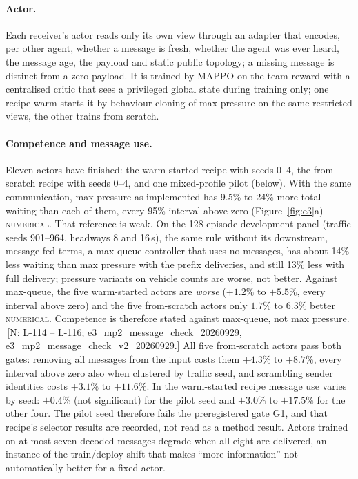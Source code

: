 \documentclass[11pt]{article}
\theoremstyle{definition}
\newcommand{\NUM}{\textsc{numerical}}
\newif\ifshownotes\shownotestrue
\newcommand{\NOTE}[1]{\ifshownotes{\color{notecol}\,\textsf{\footnotesize[N: #1]}}\fi}
\begin{document}
\paragraph{Actor.} Each receiver's actor reads only its own view through an adapter that encodes, per
other agent, whether a message is fresh, whether the agent was ever heard, the message age, the
payload and static public topology; a missing message is distinct from a zero payload. It is
trained by MAPPO on the team reward with a centralised critic that sees a privileged global state
during training only; one recipe warm-starts it by behaviour cloning of max pressure on the same
restricted views, the other trains from scratch.

\paragraph{Competence and message use.} Eleven actors have finished: the warm-started recipe with seeds
0--4, the from-scratch recipe with seeds 0--4, and one mixed-profile pilot (below). With the same
communication, max pressure as implemented has 9.5\% to 24\% more total waiting than each of them, every
95\% interval above zero (Figure~\ref{fig:e3}a) \NUM. That reference is weak. On the 128-episode development
panel (traffic seeds 901--964, headways 8 and 16\,s), the same rule without its downstream, message-fed
terms, a max-queue controller that uses no messages, has about 14\% less waiting than max pressure with the
prefix deliveries, and still 13\% less with full delivery; pressure variants on vehicle counts are worse, not
better. Against max-queue, the five warm-started actors are \emph{worse} ($+1.2\%$ to $+5.5\%$, every
interval above zero) and the five from-scratch actors only $1.7\%$ to $6.3\%$ better \NUM. Competence is
therefore stated against max-queue, not max pressure. \NOTE{L-114 -- L-116; e3\_mp2\_message\_check\_20260929,
e3\_mp2\_message\_check\_v2\_20260929.} All five from-scratch actors pass both gates: removing all
messages from the input costs them $+4.3\%$ to $+8.7\%$, every interval above zero also when clustered
by traffic seed, and scrambling sender identities costs $+3.1\%$ to $+11.6\%$.
In the warm-started recipe message use varies by seed: $+0.4\%$ (not significant) for the pilot seed
and $+3.0\%$ to $+17.5\%$ for the other four. The pilot seed therefore fails the preregistered gate G1,
and that recipe's selector results are recorded, not read as a method result. Actors trained on at most
seven decoded messages degrade when all eight are delivered, an instance of the train/deploy shift that
makes ``more information'' not automatically better for a fixed actor.
\end{document}
